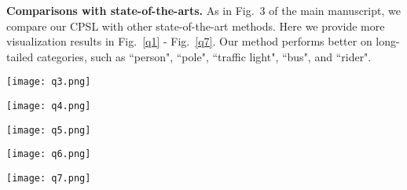 \documentclass[10pt,twocolumn,letterpaper]{article}
\begin{document}
	
	
	\textbf{Comparisons with state-of-the-arts.}
	As in Fig.~3 of the main manuscript, we compare our CPSL with other state-of-the-art methods. Here we provide more visualization results in Fig.~\ref{q1} - Fig.~\ref{q7}. Our method performs better on long-tailed categories, such as ``person", ``pole", ``traffic light", ``bus", and ``rider". 
	



\begin{figure*}[!t]
	\centering 
	\texttt{[image: q3.png]}\\
	\vspace{-2.5em}
	\caption{Qualitative comparison of different methods on the GTA5$\to$Cityscapes task.}
	\label{q3}
\end{figure*}

\begin{figure*}[!t]
	\centering 
	\texttt{[image: q4.png]}\\
	\vspace{-2.5em}
	\caption{Qualitative comparison of different methods on the GTA5$\to$Cityscapes task.}
	\label{q4}
\end{figure*}

\begin{figure*}[!t]
	\centering 
	\texttt{[image: q5.png]}\\
	\vspace{-2.5em}
	\caption{Qualitative comparison of different methods on the GTA5$\to$Cityscapes task.}
	\label{q5}
\end{figure*}

\begin{figure*}[!t]
	\centering 
	\texttt{[image: q6.png]}\\
	\vspace{-2.5em}
	\caption{Qualitative comparison of different methods on the GTA5$\to$Cityscapes task.}
	\label{q6}
\end{figure*}	

\begin{figure*}[!t]
	\centering 
	\texttt{[image: q7.png]}\\
	\vspace{-2.5em}
	\caption{Qualitative comparison of different methods on the GTA5$\to$Cityscapes task.}
	\label{q7}
\end{figure*}
\end{document}
